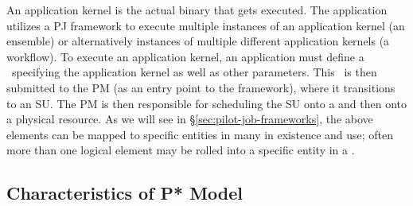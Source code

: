 \documentclass{sig-alternate}
\begin{document}




An application kernel is the actual binary that gets executed.  The
application utilizes a PJ framework to execute multiple instances of
an application kernel (an ensemble) or alternatively instances of
multiple different application kernels (a workflow).  To execute an
application kernel, an application must define a \cu \ specifying the
application kernel as well as other parameters. This \cu \ is then
submitted to the PM (as an entry point to the
\pilotjob framework), where it transitions to an SU. The PM is then
responsible for scheduling the SU onto a \pilot and then onto a
physical resource.  As we will see in \S\ref{sec:pilot-job-frameworks}, 
the above elements can
be mapped to specific entities in many \pilotjobs in existence and
use; often more than one logical element may be rolled into a specific
entity in a \pilotjob.

% 
% 


\subsection{Characteristics of P* Model}
\label{sec:p_star_elements}
\end{document}
